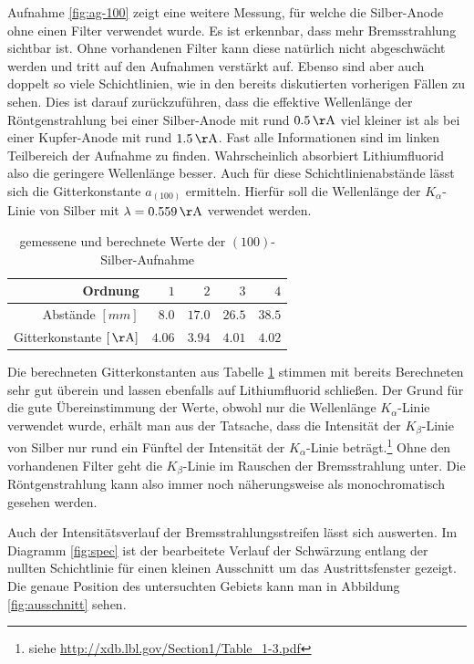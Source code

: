 	Aufnahme \ref{fig:ag-100} zeigt eine weitere Messung, für welche die Silber-Anode ohne einen Filter verwendet wurde.
	Es ist erkennbar, dass mehr Bremsstrahlung sichtbar ist.
	Ohne vorhandenen Filter kann diese natürlich nicht abgeschwächt werden und tritt auf den Aufnahmen verstärkt auf.
	Ebenso sind aber auch doppelt so viele Schichtlinien, wie in den bereits diskutierten vorherigen Fällen zu sehen.
	Dies ist darauf zurückzuführen, dass die effektive Wellenlänge der Röntgenstrahlung bei einer Silber-Anode mit rund $0.5\unit{\AA}$ viel kleiner ist als bei einer Kupfer-Anode mit rund $1.5\unit{\AA}$.
	Fast alle Informationen sind im linken Teilbereich der Aufnahme zu finden.
	Wahrscheinlich absorbiert Lithiumfluorid also die geringere Wellenlänge besser.
	Auch für diese Schichtlinienabstände lässt sich die Gitterkonstante $a_{(100)}$ ermitteln.
	Hierfür soll die Wellenlänge der $K_\alpha$-Linie von Silber mit $\lambda = 0.559\unit{\AA}$ verwendet werden.
	\begin{table}[H]
		\centering
		\begin{tabular}{r||r|r|r|r}
			Ordnung & $1$ & $2$ & $3$ & $4$ \\
			\hline
			Abstände $[\unit{mm}]$ & $8.0$ & $17.0$ & $26.5$ & $38.5$ \\
			\hline
			Gitterkonstante $[\unit{\AA}]$ & $4.06$ & $3.94$ & $4.01$ & $4.02$
		\end{tabular}
		\caption{gemessene und berechnete Werte der $(100)$-Silber-Aufnahme}
		\label{tab:ag-100-val}
	\end{table}
	Die berechneten Gitterkonstanten aus Tabelle \ref{tab:ag-100-val} stimmen mit bereits Berechneten sehr gut überein und lassen ebenfalls auf Lithiumfluorid schließen.
	Der Grund für die gute Übereinstimmung der Werte, obwohl nur die Wellenlänge $K_\alpha$-Linie verwendet wurde, erhält man aus der Tatsache, dass die Intensität der $K_\beta$-Linie von Silber nur rund ein Fünftel der Intensität der $K_\alpha$-Linie beträgt.\footnote{siehe \url{http://xdb.lbl.gov/Section1/Table_1-3.pdf}}
	Ohne den vorhandenen Filter geht die $K_\beta$-Linie im Rauschen der Bremsstrahlung unter.
	Die Röntgenstrahlung kann also immer noch näherungsweise als monochromatisch gesehen werden.

	Auch der Intensitätsverlauf der Bremsstrahlungsstreifen lässt sich auswerten.
	Im Diagramm \ref{fig:spec} ist der bearbeitete Verlauf der Schwärzung entlang der nullten Schichtlinie für einen kleinen Ausschnitt um das Austrittsfenster gezeigt.
	Die genaue Position des untersuchten Gebiets kann man in Abbildung \ref{fig:ausschnitt} sehen.

